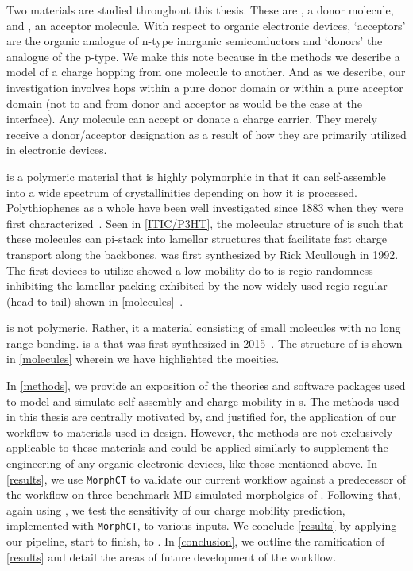 Two  materials are studied throughout this thesis.
These are , a
donor molecule, and , an acceptor molecule. With respect to organic electronic devices, `acceptors' are the
organic analogue of n-type inorganic semiconductors and `donors' the analogue
of the p-type. We make this note because in the methods we describe a model of
a charge hopping from one molecule to another. And as we describe, our
investigation involves hops within a pure donor domain or within a pure
acceptor domain (not to and from donor and acceptor as would be the case at the interface). 
Any molecule can accept or donate a charge carrier.
They merely receive a donor/acceptor designation as a result of how they
are primarily utilized in electronic devices. 

 is a polymeric material that is highly polymorphic in that it can self-assemble into a wide spectrum of
crystallinities depending on how it is processed.
Polythiophenes as a whole have been well investigated 
since 1883 when they were first characterized~\cite{Poelking2014}.
Seen in \autoref{ITIC/P3HT}, the molecular structure of 
is such that these molecules can pi-stack into lamellar structures that facilitate fast charge transport along
the backbones.  was first synthesized by Rick Mcullough in 1992. The first devices to utilize  showed
a low mobility do to is regio-randomness inhibiting the lamellar packing exhibited by the now widely used
regio-regular (head-to-tail)  shown in \autoref{molecules}~\cite{Zaumseil2014}. 

 is not polymeric. Rather, it a material consisting of small molecules with no long range bonding.
 is a  that was first synthesized in 2015~\cite{Bai201U}. The structure of  is shown in
\autoref{molecules} wherein we have highlighted the moeities.  

In \autoref{methods}, we
provide an exposition of the theories and software packages used to model and simulate self-assembly and charge mobility in
s.
The methods used in this thesis are centrally motivated by, and justified for, 
the application of our workflow to materials
used in  design. However, the methods are
not exclusively applicable to these materials and could be applied similarly to supplement the engineering of any organic
electronic devices, like those mentioned above. 
In \autoref{results}, we use \texttt{MorphCT} to validate our current workflow against a predecessor of the 
workflow on three benchmark MD simulated morpholgies of . 
Following that, again using , we test the sensitivity of our charge mobility prediction, 
implemented with \texttt{MorphCT}, to various inputs. We conclude \autoref{results} by applying our pipeline,
start to finish, to . 
In \autoref{conclusion}, we outline the ramification of \autoref{results} and detail the areas of future development of the workflow. 

